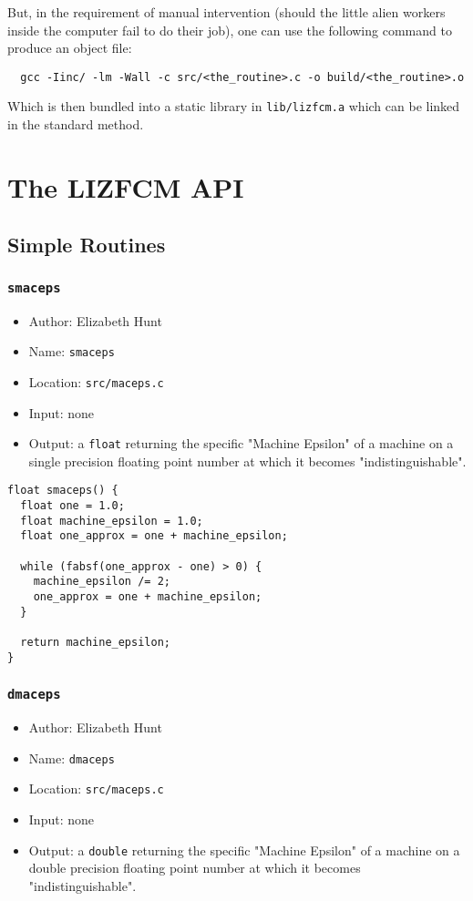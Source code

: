 \documentclass[11pt]{article}
\begin{document}
But, in the requirement of manual intervention (should the little alien workers
inside the computer fail to do their job), one can use the following command to
produce an object file:

\begin{verbatim}
  gcc -Iinc/ -lm -Wall -c src/<the_routine>.c -o build/<the_routine>.o
\end{verbatim}

Which is then bundled into a static library in \texttt{lib/lizfcm.a} which can be linked
in the standard method.

\section{The LIZFCM API}
\label{sec:org832532a}
\subsection{Simple Routines}
\label{sec:org540b602}
\subsubsection{\texttt{smaceps}}
\label{sec:org4d03b6e}
\begin{itemize}
\item Author: Elizabeth Hunt
\item Name: \texttt{smaceps}
\item Location: \texttt{src/maceps.c}
\item Input: none
\item Output: a \texttt{float} returning the specific "Machine Epsilon" of a machine on a
single precision floating point number at which it becomes "indistinguishable".
\end{itemize}

\begin{verbatim}
float smaceps() {
  float one = 1.0;
  float machine_epsilon = 1.0;
  float one_approx = one + machine_epsilon;

  while (fabsf(one_approx - one) > 0) {
    machine_epsilon /= 2;
    one_approx = one + machine_epsilon;
  }

  return machine_epsilon;
}
\end{verbatim}

\subsubsection{\texttt{dmaceps}}
\label{sec:org2603bfc}
\begin{itemize}
\item Author: Elizabeth Hunt
\item Name: \texttt{dmaceps}
\item Location: \texttt{src/maceps.c}
\item Input: none
\item Output: a \texttt{double} returning the specific "Machine Epsilon" of a machine on a
double precision floating point number at which it becomes "indistinguishable".
\end{itemize}
\end{document}
